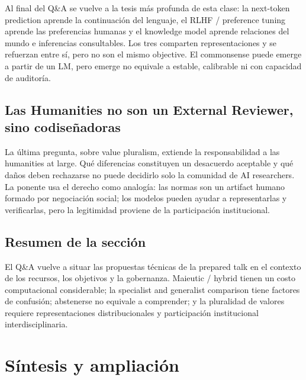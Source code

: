 \documentclass[a4paper]{article}
\begin{document}
Al final del Q\&A se vuelve a la tesis más profunda de esta clase: la next-token prediction aprende la continuación del lenguaje, el RLHF / preference tuning aprende las preferencias humanas y el knowledge model aprende relaciones del mundo e inferencias consultables. Los tres comparten representaciones y se refuerzan entre sí, pero no son el mismo objective. El commonsense puede emerge a partir de un LM, pero emerge no equivale a estable, calibrable ni con capacidad de auditoría.


\subsection{Las Humanities no son un External Reviewer, sino codiseñadoras}

La última pregunta, sobre value pluralism, extiende la responsabilidad a las humanities at large. Qué diferencias constituyen un desacuerdo aceptable y qué daños deben rechazarse no puede decidirlo solo la comunidad de AI researchers. La ponente usa el derecho como analogía: las normas son un artifact humano formado por negociación social; los modelos pueden ayudar a representarlas y verificarlas, pero la legitimidad proviene de la participación institucional.

\subsection{Resumen de la sección}

El Q\&A vuelve a situar las propuestas técnicas de la prepared talk en el contexto de los recursos, los objetivos y la gobernanza. Maieutic / hybrid tienen un costo computacional considerable; la specialist and generalist comparison tiene factores de confusión; abstenerse no equivale a comprender; y la pluralidad de valores requiere representaciones distribucionales y participación institucional interdisciplinaria.
\section{Síntesis y ampliación}
\end{document}
